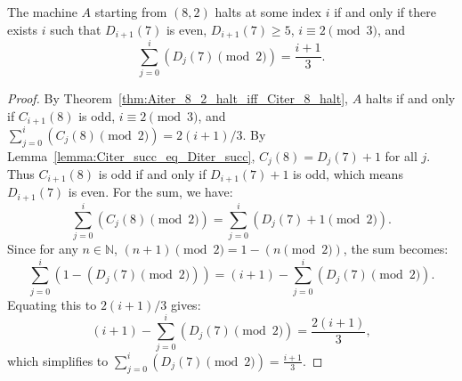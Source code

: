 \begin{theorem}
  \label{thm:Aiter_8_2_halt_iff_Diter_7_halt}
  \leanok
  The machine $A$ starting from $(8, 2)$ halts at some index $i$ if and only if there exists $i$ such that $D_{i+1}(7)$ is even, $D_{i+1}(7) \geq 5$, $i \equiv 2 \pmod 3$, and
  \[ \sum_{j=0}^i (D_j(7) \pmod 2) = \frac{i+1}{3}. \]
  \begin{proof}
    \leanok
    By Theorem~\ref{thm:Aiter_8_2_halt_iff_Citer_8_halt}, $A$ halts if and only if $C_{i+1}(8)$ is odd, $i \equiv 2 \pmod 3$, and $\sum_{j=0}^i (C_j(8) \pmod 2) = 2(i+1)/3$.
    By Lemma~\ref{lemma:Citer_succ_eq_Diter_succ}, $C_j(8) = D_j(7) + 1$ for all $j$.
    Thus $C_{i+1}(8)$ is odd if and only if $D_{i+1}(7) + 1$ is odd, which means $D_{i+1}(7)$ is even.
    For the sum, we have:
    \[ \sum_{j=0}^i (C_j(8) \pmod 2) = \sum_{j=0}^i (D_j(7) + 1 \pmod 2). \]
    Since for any $n \in \mathbb{N}$, $(n+1) \pmod 2 = 1 - (n \pmod 2)$, the sum becomes:
    \[ \sum_{j=0}^i (1 - (D_j(7) \pmod 2)) = (i+1) - \sum_{j=0}^i (D_j(7) \pmod 2). \]
    Equating this to $2(i+1)/3$ gives:
    \[ (i+1) - \sum_{j=0}^i (D_j(7) \pmod 2) = \frac{2(i+1)}{3}, \]
    which simplifies to $\sum_{j=0}^i (D_j(7) \pmod 2) = \frac{i+1}{3}$.
  \end{proof}
\end{theorem}
